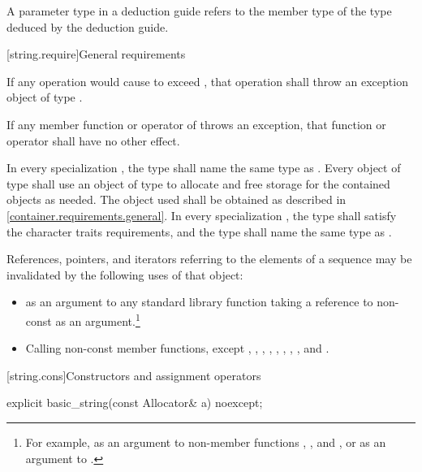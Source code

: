 \pnum
A  parameter type in
a  deduction guide
refers to the  member type of
the type deduced by the deduction guide.

[string.require]{General requirements}

\pnum
If any operation would cause  to
exceed , that operation shall throw an
exception object of type .

\pnum
If any member function or operator of  throws an exception, that
function or operator shall have no other effect.

\pnum
In every specialization ,
the type  shall name the same type
as . Every object of type
 shall use an object of type
 to allocate and free storage for the contained 
objects as needed. The  object used shall be
obtained as described in \ref{container.requirements.general}.
In every specialization ,
the type  shall satisfy
the character traits requirements, and
the type  shall name the same type as .

\pnum
References, pointers, and iterators referring to the elements of a
 sequence may be
invalidated by the following uses of that  object:

\begin{itemize}
\item as an argument to any standard library function taking a reference to non-const
 as an argument.\footnote{For example, as an argument to non-member
functions ,
, and , or as
an argument to .}

\item Calling non-const member functions, except
,
,
,
,
,
,
,
,
and
.
\end{itemize}

[string.cons]{Constructors and assignment operators}

%
\begin{itemdecl}
explicit basic_string(const Allocator& a) noexcept;
\end{itemdecl}

